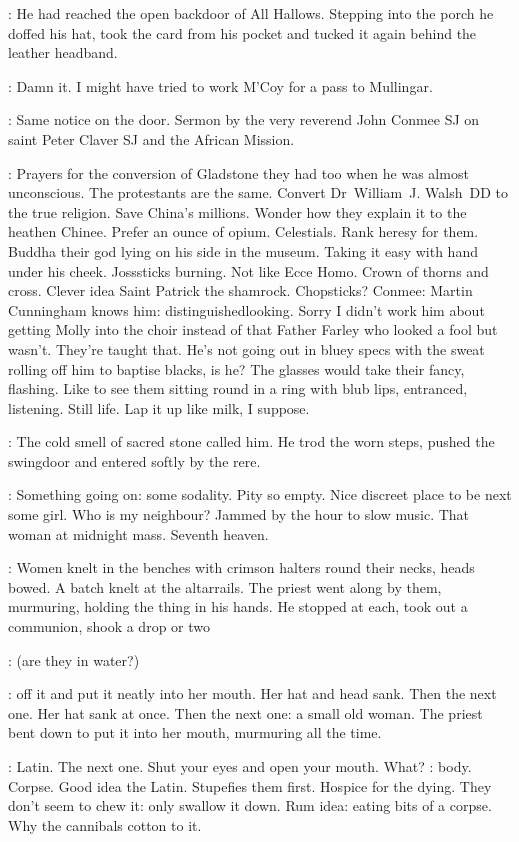 :
He had reached the open backdoor of All Hallows.
Stepping into the porch
he doffed his hat,
took the card from his pocket
and tucked it again behind the leather headband.

\BloomInt:
Damn it.
I might have tried to work M'Coy for a pass to Mullingar.

:
Same notice on the door.
Sermon by the very reverend John Conmee SJ
on saint Peter Claver SJ and the African Mission.

\BloomInt:
Prayers for the conversion of Gladstone they had too
when he was almost unconscious.
The protestants are the same.
Convert Dr~William~J. Walsh~DD to the true religion.
Save China's millions.
Wonder how they explain it to the heathen Chinee.
Prefer an ounce of opium.
Celestials.
Rank heresy for them.
Buddha their god lying on his side in the museum.
Taking it easy
with hand under his cheek.
Josssticks burning.
Not like Ecce Homo.
Crown of thorns and cross.
Clever idea
Saint Patrick the shamrock.
Chopsticks?
Conmee:
Martin Cunningham knows him:
distinguishedlooking.
Sorry I didn't work him about getting Molly into the choir
instead of that Father Farley who looked a fool but wasn't.
They're taught that.
He's not going out in bluey specs
with the sweat rolling off him to baptise blacks,
is he?
The glasses would take their fancy, flashing.
Like to see them sitting round in a ring with blub lips,
entranced, listening.
Still life.
Lap it up like milk, I suppose.

:
The cold smell of sacred stone called him.
He trod the worn steps,
pushed the swingdoor
and entered softly by the rere.

\BloomInt:
Something going on: some sodality.
Pity so empty.
Nice discreet place to be next some girl.
Who is my neighbour?
Jammed by the hour to slow music.
That woman at midnight mass.
Seventh heaven.

:
Women knelt in the benches with crimson halters round their necks,
heads bowed.
A batch knelt at the altarrails.
The priest went along by them, murmuring,
holding the thing in his hands.
He stopped at each, took out a communion,
shook a drop or two

\BloomInt:
(are they in water?)

:
off it and put it neatly into her mouth.
Her hat and head sank.
Then the next one.
Her hat sank at once.
Then the next one:
a small old woman.
The priest bent down to put it into her mouth,
murmuring all the time.

\BloomInt:
Latin.
The next one.
Shut your eyes and open your mouth.
What?
:
body.
Corpse.
Good idea the Latin.
Stupefies them first.
Hospice for the dying.
They don't seem to chew it:
only swallow it down.
Rum idea:
eating bits of a corpse.
Why the cannibals cotton to it.

